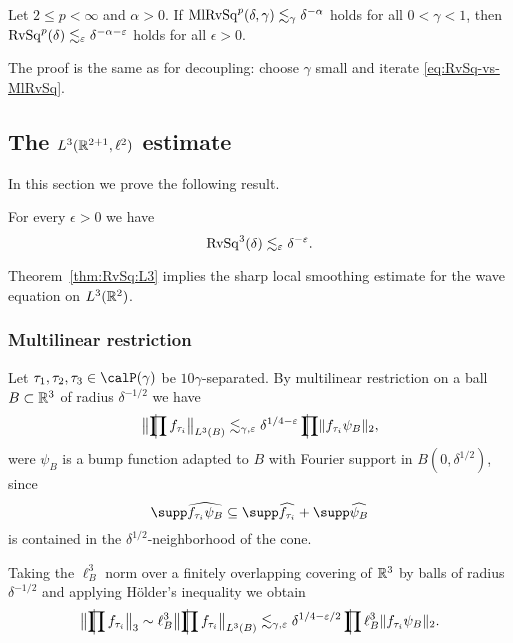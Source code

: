 \begin{corollary}
\label{cor:RvSq-vs-MlRvSq}
Let $2 \leq p < \infty$ and $\alpha > 0$.
If $\mathrm{MlRvSq}^{p}(\delta,\gamma) \lesssim_{\gamma} \delta^{-\alpha}$ holds for all $0< \gamma < 1$, then $\mathrm{RvSq}^{p}(\delta) \lesssim_{\varepsilon} \delta^{-\alpha-\varepsilon}$ holds for all $\epsilon>0$.
\end{corollary}
The proof is the same as for decoupling: choose $\gamma$ small and iterate \eqref{eq:RvSq-vs-MlRvSq}.

\subsection{The $L^{3}(\mathbb{R}^{2+1},\ell^{2})$ estimate}
In this section we prove the following result.
\begin{theorem}[{\cite{MR2927399}}]
\label{thm:RvSq:L3}
For every $\epsilon>0$ we have
\begin{equation}
\label{eq:RvSq:L3}
\mathrm{RvSq}^{3}(\delta) \lesssim_{\varepsilon} \delta^{-\varepsilon}.
\end{equation}
\end{theorem}
Theorem~\ref{thm:RvSq:L3} implies the sharp local smoothing estimate for the wave equation on $L^{3}(\mathbb{R}^{2})$.

\subsubsection{Multilinear restriction}
Let $\tau_{1},\tau_{2},\tau_{3} \in \Part{\gamma}$ be $10\gamma$-separated.
By multilinear restriction on a ball $B \subset \mathbb{R}^{3}$ of radius $\delta^{-1/2}$ we have
\begin{equation}
\label{eq:MlRvSq:multRestr:ball}
\norm[\big]{ \avprod f_{\tau_{i}} }_{L^{3}(B)}
\lesssim_{\gamma,\epsilon}
\delta^{1/4-\epsilon} \avprod \norm{f_{\tau_{i}} \psi_{B}}_{2},
\end{equation}
were $\psi_{B}$ is a bump function adapted to $B$ with Fourier support in $B(0,\delta^{1/2})$, since
\[
\supp \widehat{ f_{\tau_{i}} \psi_{B} }
\subseteq
\supp \widehat{ f_{\tau_{i}} } + \supp \widehat{ \psi_{B} }
\]
is contained in the $\delta^{1/2}$-neighborhood of the cone.

Taking the $\ell^{3}_{B}$ norm over a finitely overlapping covering of $\mathbb{R}^{3}$ by balls of radius $\delta^{-1/2}$ and applying H\"older's inequality we obtain
\begin{equation}
\label{eq:MlRvSq:multRestr}
\norm[\big]{ \avprod f_{\tau_i} }_{3}
\sim
\ell^{3}_{B} \norm[\big]{ \avprod f_{\tau_i} }_{L^3(B)}
\lesssim_{\gamma,\epsilon} \delta^{1/4-\epsilon/2} \avprod \ell^{3}_{B} \norm{f_{\tau_i} \psi_{B}}_{2}.
\end{equation}


